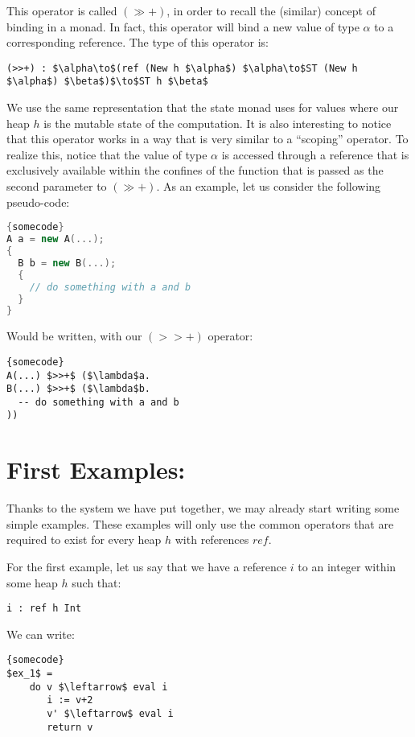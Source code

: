 \documentclass[a4paper]{article}
\begin{document}
 This operator is called $\left(\gg +\right)$, in order to recall the (similar) concept of binding in a monad. In fact, this operator will bind a new value of type $\alpha $ to a corresponding reference. The type of this operator is:

\begin{lstlisting}
(>>+) : $\alpha\to$(ref (New h $\alpha$) $\alpha\to$ST (New h $\alpha$) $\beta$)$\to$ST h $\beta$
\end{lstlisting}


We use the same representation that the state monad uses for values where our heap $h$ is the mutable state of the computation. It is also interesting to notice that this operator works in a way that is very similar to a ``scoping'' operator. To realize this, notice that the value of type $\alpha $ is accessed through a reference that is exclusively available within the confines of the function that is passed as the second parameter to $(\gg +)$. As an example, let us consider the following pseudo-code:

\begin{lstlisting}[frame=tb,mathescape,language=C++]{somecode}
A a = new A(...);
{
  B b = new B(...);
  {
    // do something with a and b
  }
}
\end{lstlisting}

Would be written, with our $(>>+)$ operator:

\begin{lstlisting}[frame=tb,mathescape]{somecode}
A(...) $>>+$ ($\lambda$a.
B(...) $>>+$ ($\lambda$b.
  -- do something with a and b
))
\end{lstlisting}

\section{First Examples:}

 Thanks to the system we have put together, we may already start writing some simple examples. These examples will only use the common operators that are required to exist for every heap $h$ with references $ref$.

 For the first example, let us say that we have a reference $i$ to an integer within some heap $h$ such that:

\begin{lstlisting}
i : ref h Int
\end{lstlisting}

We can write:

\begin{lstlisting}[frame=tb,mathescape]{somecode}
$ex_1$ =
	do v $\leftarrow$ eval i
	   i := v+2
	   v' $\leftarrow$ eval i
	   return v
\end{lstlisting}
\end{document}
